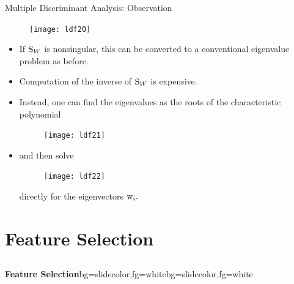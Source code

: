 \begin{frame}{Multiple Discriminant Analysis: Observation}

\begin{figure}
\texttt{[image: ldf20]}
\end{figure}
\begin{itemize}
\item If ${\rm S}_W$ is nonsingular, this can be converted to a conventional eigenvalue problem as before. 
\item Computation of the inverse of ${\rm S}_W$ is expensive.
\item Instead, one can find the eigenvalues as the roots of the characteristic polynomial
\begin{figure}
\texttt{[image: ldf21]}
\end{figure}
\item and then solve
\begin{figure}
\texttt{[image: ldf22]}
\end{figure}
directly for the eigenvectors ${\rm w}_i.$
\end{itemize}
\end{frame}


\section{Feature Selection}
\subsection{}

\begin{frame}{}
\begin{variableblock}{\centering \Large \textbf{\vspace{4pt}\newline Feature Selection\vspace{4pt}}}{bg=slidecolor,fg=white}{bg=slidecolor,fg=white}
\end{variableblock}
\end{frame}

